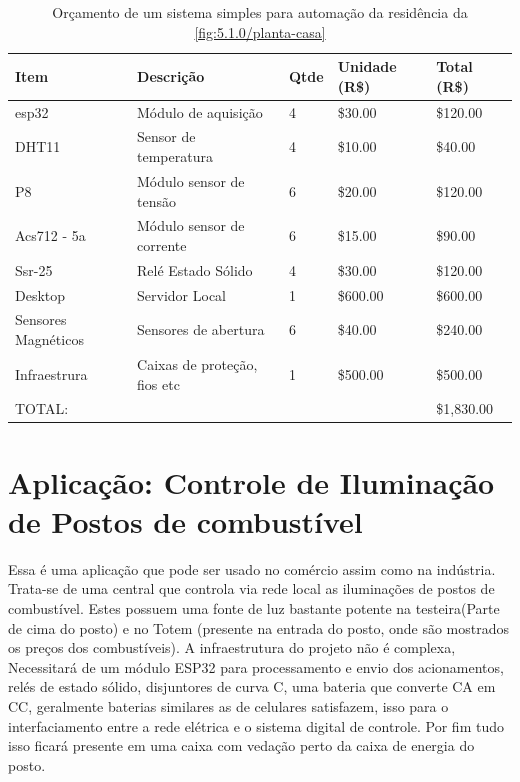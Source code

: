 \begin{table}[h!]
\centering
\caption{Orçamento de um sistema simples para automação da residência da \ref{fig:5.1.0/planta-casa}}
\begin{tabular}{|l|l|l|l|l|}
\hline
Item                & Descrição                    & Qtde & Unidade (R\$) & Total (R\$) \\ \hline
esp32               & Módulo de aquisição          & 4    & \$30.00       & \$120.00    \\ \hline
DHT11               & Sensor de temperatura        & 4    & \$10.00       & \$40.00     \\ \hline
P8                  & Módulo sensor de tensão      & 6    & \$20.00       & \$120.00    \\ \hline
Acs712 - 5a         & Módulo sensor de corrente    & 6    & \$15.00       & \$90.00     \\ \hline
Ssr-25              & Relé Estado Sólido           & 4    & \$30.00       & \$120.00    \\ \hline
Desktop             & Servidor Local               & 1    & \$600.00      & \$600.00    \\ \hline
Sensores Magnéticos & Sensores de abertura         & 6    & \$40.00       & \$240.00    \\ \hline
Infraestrura        & Caixas de proteção, fios etc & 1    & \$500.00      & \$500.00    \\ \hline
\multicolumn{4}{|l|}{TOTAL:}                                              & \$1,830.00  \\ \hline
\end{tabular}
\label{table:planta-casa}
\end{table}


\section{Aplicação: Controle de Iluminação de Postos de combustível}
\label{section:posto}


Essa é uma aplicação que pode ser usado no comércio assim como na indústria. Trata-se de uma central que controla via rede local as iluminações de postos de combustível. Estes possuem uma fonte de luz bastante potente na testeira(Parte de cima do posto) e no Totem (presente na entrada do posto, onde são mostrados os preços dos combustíveis). A infraestrutura do projeto não é complexa, Necessitará de um módulo ESP32 para processamento e envio dos acionamentos, relés de estado sólido, disjuntores de curva C, uma bateria que converte CA em CC, geralmente baterias similares as de celulares satisfazem, isso para o interfaciamento entre a rede elétrica e o sistema digital de controle. Por fim tudo isso ficará presente em uma caixa com vedação perto da caixa de energia do posto.

